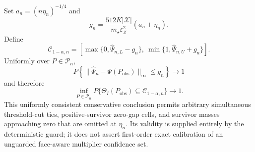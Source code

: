 Set \(a_n=(n\eta_n)^{-1/4}\) and
\[
g_n=\frac{512K|\mathcal X|}{m_{\star}\varepsilon_Z^2}(a_n+\eta_n).
\]
Define
\[
\mathcal C_{1-\alpha,n}
=\left[\max\{0,\widehat\Psi_{n,L}-g_n\},\ \min\{1,\widehat\Psi_{n,U}+g_n\}\right].
\]
Uniformly over \(P\in\mathcal P_n\),
\[
P\!\left\{\|\widehat\Psi_n-\Psi(P_{\mathrm{obs}})\|_\infty\le g_n\right\}\to1
\]
and therefore
\[
\inf_{P\in\mathcal P_n}P\{\Theta_I(P_{\mathrm{obs}})\subseteq\mathcal C_{1-\alpha,n}\}\to1.
\]
This uniformly consistent conservative conclusion permits arbitrary simultaneous threshold-cut ties, positive-survivor zero-gap cells, and survivor masses approaching zero that are omitted at \(\eta_n\).  Its validity is supplied entirely by the deterministic guard; it does not assert first-order exact calibration of an unguarded face-aware multiplier confidence set.